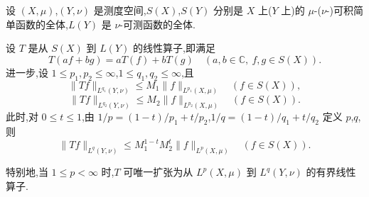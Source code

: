 \begin{theorem}\label{thm:1.2.17}
设 $(X, \mu)$,$(Y, \nu)$ 是测度空间,$S(X)$,$S(Y)$ 分别是 $X$ 上($Y$ 上)的 $\mu$-($\nu$-)可积简单函数的全体,$L(Y)$ 是 $\nu$-可测函数的全体.

设 $T$ 是从 $S(X)$ 到 $L(Y)$ 的线性算子,即满足
\begin{equation}\tag{1.2.9}
T(af + bg) = aT(f) + bT(g) \quad (a, b \in \mathbb{C}, \ f, g \in S(X)).
\label{eq:1.2.9}\end{equation}
进一步,设 $1 \leq p_{1}, p_{2} \leq \infty$,$1 \leq q_{1}, q_{2} \leq \infty$,且
\begin{equation}\tag{1.2.10}
\| Tf \|_{L^{q_{1}}(Y, \nu)} \leq M_{1}\| f \|_{L^{p_{1}}(X, \mu)} \quad (f \in S(X)),
\label{eq:1.2.10}\end{equation}
\begin{equation}\tag{1.2.11}
\| Tf \|_{L^{q_{2}}(Y, \nu)} \leq M_{2}\| f \|_{L^{p_{2}}(X, \mu)} \quad (f \in S(X)).
\label{eq:1.2.11}\end{equation}
此时,对 $0 \leq t \leq 1$,由 $1/p = (1 - t)/p_{1} + t/p_{2}$,$1/q = (1 - t)/q_{1} + t/q_{2}$ 定义 $p$,$q$,则
\begin{equation}\tag{1.2.12}
\| Tf \|_{L^{q}(Y, \nu)} \leq M_{1}^{1-t}M_{2}^{t}\| f \|_{L^{p}(X, \mu)} \quad (f \in S(X)).
\label{eq:1.2.12}\end{equation}

特别地,当 $1 \leq p < \infty$ 时,$T$ 可唯一扩张为从 $L^{p}(X, \mu)$ 到 $L^{q}(Y, \nu)$ 的有界线性算子.
\end{theorem}

